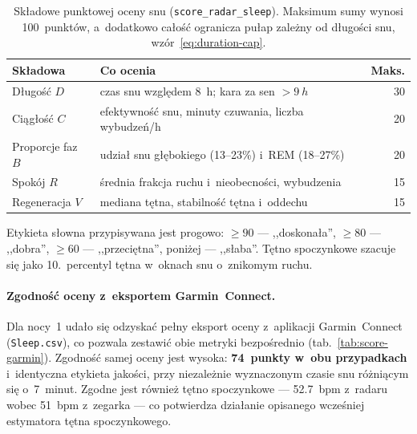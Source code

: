 \documentclass[12pt,a4paper,oneside]{report}
\begin{document}
\begin{table}[H]
\centering
\caption[Składowe oceny jakości snu]{Składowe punktowej oceny snu
(\texttt{score\_radar\_sleep}). Maksimum sumy wynosi 100~punktów, a~dodatkowo
całość ogranicza pułap zależny od długości snu, wzór~\eqref{eq:duration-cap}.}
\label{tab:sleep-score}
\small
\begin{tabular}{@{}llr@{}}
\toprule
\textbf{Składowa} & \textbf{Co ocenia} & \textbf{Maks.} \\
\midrule
Długość $D$        & czas snu względem \SI{8}{h}; kara za sen $>\SI{9}{h}$ & 30 \\
Ciągłość $C$       & efektywność snu, minuty czuwania, liczba wybudzeń/h & 20 \\
Proporcje faz $B$  & udział snu głębokiego (13--23\%) i~REM (18--27\%) & 20 \\
Spokój $R$         & średnia frakcja ruchu i~nieobecności, wybudzenia & 15 \\
Regeneracja $V$    & mediana tętna, stabilność tętna i~oddechu & 15 \\
\bottomrule
\end{tabular}
\end{table}

Etykieta słowna przypisywana jest progowo: $\geq 90$ --- ,,doskonała'',
$\geq 80$ --- ,,dobra'', $\geq 60$ --- ,,przeciętna'', poniżej --- ,,słaba''.
Tętno spoczynkowe szacuje się jako 10.~percentyl tętna w~oknach snu o~znikomym
ruchu.

\paragraph{Zgodność oceny z~eksportem Garmin~Connect.} Dla nocy~1 udało się
odzyskać pełny eksport oceny z~aplikacji Garmin~Connect (\texttt{Sleep.csv}),
co pozwala zestawić obie metryki bezpośrednio (tab.~\ref{tab:score-garmin}).
Zgodność samej oceny jest wysoka: \textbf{74~punkty w~obu przypadkach}
i~identyczna etykieta jakości, przy niezależnie wyznaczonym czasie snu
różniącym się o~7~minut. Zgodne jest również tętno spoczynkowe --- \SI{52.7}{bpm}
z~radaru wobec \SI{51}{bpm} z~zegarka --- co potwierdza działanie opisanego
wcześniej estymatora tętna spoczynkowego.
\end{document}
